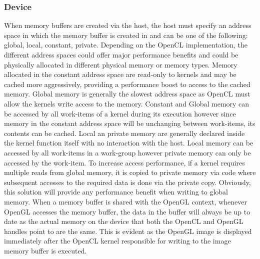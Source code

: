 \documentclass[final]{cmpreport}
\begin{document}
\subsubsection{Device}

When memory buffers are created via the host, the host must specify an address space in which the memory buffer is created in and can be one of the following: global, local, constant, private. Depending on the OpenCL implementation, the different address spaces could offer major performance benefits and could be physically allocated in different physical memory or memory types. Memory allocated in the constant address space are read-only to kernels and may be cached more aggressively, providing a performance boost to access to the cached memory. Global memory is generally the slowest address space as OpenCL must allow the kernels write access to the memory. Constant and Global memory can be accessed by all work-items of a kernel during its execution however since memory in the constant address space will be unchanging between work-items, its contents can be cached. Local an private memory are generally declared inside the kernel function itself with no interaction with the host. Local memory can be accessed by all work-items in a work-group however private memory can only be accessed by the work-item. To increase access performance, if a kernel requires multiple reads from global memory, it is copied to private memory via code where subsequent accesses to the required data is done via the private copy. Obviously, this solution will provide any performance benefit when writing to global memory. When a memory buffer is shared with the OpenGL context, whenever OpenGL accesses the memory buffer, the data in the buffer will always be up to date as the actual memory on the device that both the OpenCL and OpenGL handles point to are the same. This is evident as the OpenGL image is displayed immediately after the OpenCL kernel responsible for writing to the image memory buffer is executed.
\end{document}
